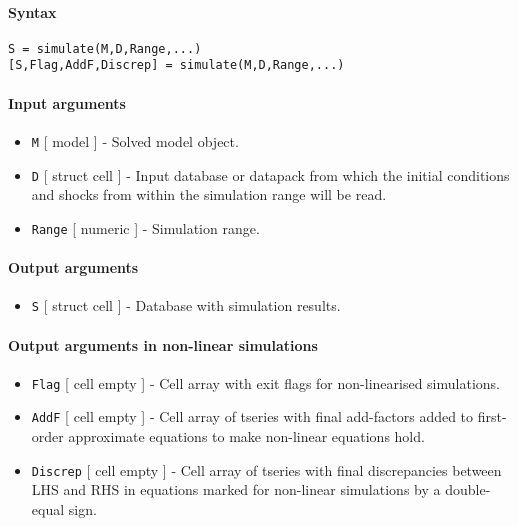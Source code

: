 


	\paragraph{Syntax}\label{syntax}

\begin{verbatim}
S = simulate(M,D,Range,...)
[S,Flag,AddF,Discrep] = simulate(M,D,Range,...)
\end{verbatim}

\paragraph{Input arguments}\label{input-arguments}

\begin{itemize}
\item
  \texttt{M} {[} model {]} - Solved model object.
\item
  \texttt{D} {[} struct \textbar{} cell {]} - Input database or datapack
  from which the initial conditions and shocks from within the
  simulation range will be read.
\item
  \texttt{Range} {[} numeric {]} - Simulation range.
\end{itemize}

\paragraph{Output arguments}\label{output-arguments}

\begin{itemize}
\itemsep1pt\parskip0pt
\item
  \texttt{S} {[} struct \textbar{} cell {]} - Database with simulation
  results.
\end{itemize}

\paragraph{Output arguments in non-linear
simulations}\label{output-arguments-in-non-linear-simulations}

\begin{itemize}
\item
  \texttt{Flag} {[} cell \textbar{} empty {]} - Cell array with exit
  flags for non-linearised simulations.
\item
  \texttt{AddF} {[} cell \textbar{} empty {]} - Cell array of tseries
  with final add-factors added to first-order approximate equations to
  make non-linear equations hold.
\item
  \texttt{Discrep} {[} cell \textbar{} empty {]} - Cell array of tseries
  with final discrepancies between LHS and RHS in equations marked for
  non-linear simulations by a double-equal sign.
\end{itemize}

